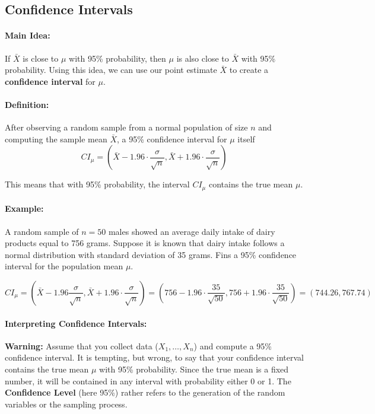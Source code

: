 \subsection{Confidence Intervals}
\paragraph*{Main Idea:}
If $\bar{X}$ is close to $\mu$ with 95\% probability, then $\mu$ is also close to $\bar{X}$ with 95\% probability.
Using this idea, we can use our point estimate $\bar{X}$ to create a \textbf{confidence interval} for $\mu$.

\paragraph*{Definition:}
After observing a random sample from a normal population of size $n$ and computing the sample mean $\bar{X}$,
a 95\% confidence interval for $\mu$ itself
\[
    CI_\mu = (\bar{X} - 1.96 \cdot \frac{\sigma}{\sqrt{n}}, \bar{X} + 1.96 \cdot \frac{\sigma}{\sqrt{n}})
\]

This means that with 95\% probability, the interval $CI_\mu$ contains the true mean $\mu$.

\paragraph*{Example:}
A random sample of $n=50$ males showed an average daily intake of dairy products equal to 756 grams.
Suppose it is known that dairy intake follows a normal distribution with standard deviation of
35 grams. Fins a 95\% confidence interval for the population mean $\mu$.

\[
    CI_\mu = (\bar{X} - 1.96 \frac{\sigma}{\sqrt{n}}, \bar{X} + 1.96 \cdot \frac{\sigma}{\sqrt{n}}) = (756 - 1.96 \cdot \frac{35}{\sqrt{50}}, 756 + 1.96 \cdot \frac{35}{\sqrt{50}}) = (744.26, 767.74)
\]

\paragraph*{Interpreting Confidence Intervals:}
\textbf{Warning:} Assume that you collect data ($X_1, \dots, X_n$) and compute a 95\% confidence interval.
It is tempting, but wrong, to say that your confidence interval contains the true mean $\mu$ with 95\% probability.
Since the true mean is a fixed number, it will be contained in any interval with probability either 0 or 1. The
\textbf{Confidence Level} (here 95\%) rather refers to the generation of the random variables or the sampling process.

